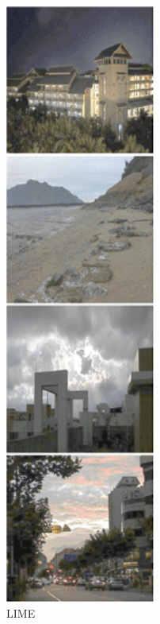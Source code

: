 \documentclass[CJK,aspectratio=169]{beamer}  %
\begin{document}
\begin{frame}
\begin{figure}
\begin{minipage}{.08\paperwidth}
			\label{fig: LIME}	
			\caption*{\tiny LIME}
		\end{minipage}
		\begin{minipage}{.08\paperwidth}
			\centering
			\setlength{\abovecaptionskip}{-0.45cm}
			\includegraphics[width=\linewidth]{picture/LLIE/LightingNet/LTC}

\end{minipage}
\end{figure}
\end{frame}
\end{document}
